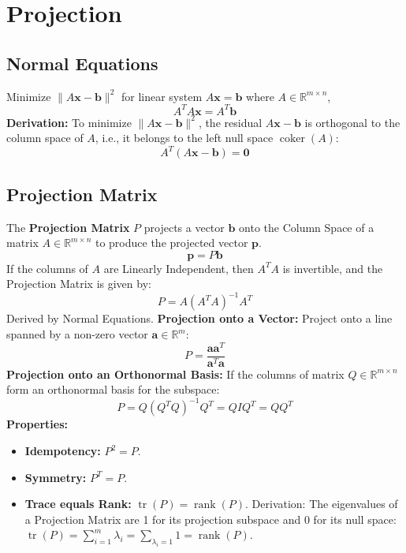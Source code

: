 \documentclass{article}
\begin{document}
\newpage
\section{Projection}

\subsection{Normal Equations}

Minimize $\|A\mathbf{x} - \mathbf{b}\|^2$ for linear system $A\mathbf{x} = \mathbf{b}$ where $A \in \mathbb{R}^{m \times n}$,
\[
    A^T A \mathbf{x} = A^T \mathbf{b}
\]
\textbf{Derivation:} To minimize $\|A\mathbf{x} - \mathbf{b}\|^2$, the residual $A\mathbf{x} - \mathbf{b}$ is orthogonal to the column space of $A$, i.e., it belongs to the left null space $\operatorname{coker}(A)$:
\[
    A^T(A\mathbf{x} - \mathbf{b}) = \mathbf{0}
\]

\subsection{Projection Matrix}

The \textbf{Projection Matrix} $P$ projects a vector $\mathbf{b}$ onto the Column Space of a matrix $A \in \mathbb{R}^{m \times n}$ to produce the projected vector $\mathbf{p}$.
\[
    \mathbf{p} = P\mathbf{b}
\]
If the columns of $A$ are Linearly Independent, then $A^TA$ is invertible, and the Projection Matrix is given by:
\[
    P = A(A^TA)^{-1}A^T
\]
Derived by Normal Equations.
\newline
\textbf{Projection onto a Vector:}
\newline
Project onto a line spanned by a non-zero vector $\mathbf{a} \in \mathbb{R}^m$:
\[
    P = \frac{\mathbf{a}\mathbf{a}^T}{\mathbf{a}^T\mathbf{a}}
\]
\textbf{Projection onto an Orthonormal Basis:}
\newline
If the columns of matrix $Q \in \mathbb{R}^{m \times n}$ form an orthonormal basis for the subspace:
\[
    P = Q(Q^TQ)^{-1}Q^T = QIQ^T = QQ^T
\]
\textbf{Properties:}
\begin{itemize}
    \item \textbf{Idempotency:} $P^2 = P$.
    \item \textbf{Symmetry:} $P^T = P$.
    \item \textbf{Trace equals Rank:} $\operatorname{tr}(P) = \operatorname{rank}(P)$.
    \newline
    Derivation: The eigenvalues of a Projection Matrix are 1 for its projection subspace and 0 for its null space: $\operatorname{tr}(P) = \sum_{i=1}^m \lambda_i = \sum_{\lambda_i=1} 1 = \operatorname{rank}(P)$.
\end{itemize}
\end{document}
